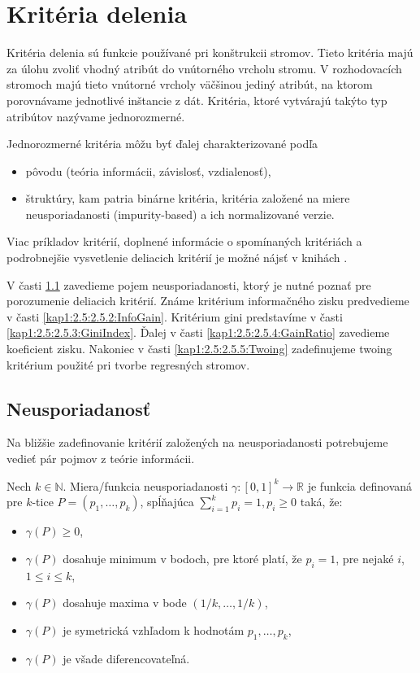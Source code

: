 \section{Kritéria delenia}\label{kap1:2.5:DTSplitCriterias}
Kritéria delenia sú funkcie používané pri konštrukcii stromov. Tieto kritéria majú za úlohu zvoliť vhodný atribút do vnútorného vrcholu stromu.
V rozhodovacích stromoch majú tieto vnútorné vrcholy väčšinou jediný atribút, na ktorom porovnávame jednotlivé inštancie z dát. Kritéria, ktoré vytvárajú takýto typ atribútov nazývame jednorozmerné.

Jednorozmerné kritéria môžu byť ďalej charakterizované podľa
\begin{itemize}
\item pôvodu (teória informácii, závislosť, vzdialenosť),
\item štruktúry, kam patria binárne kritéria, kritéria založené na miere neusporiadanosti (impurity-based) a ich normalizované verzie.
\end{itemize}

Viac príkladov kritérií, doplnené informácie o spomínaných kritériách a podrobnejšie vysvetlenie deliacich kritérií je možné nájsť v knihách \cite{kap1-DataMiningForTrees,kap1-StatisticLearn}. 

V časti \ref{kap1:2.5:2.5.1:Impurity} zavedieme pojem neusporiadanosti, ktorý je nutné poznať pre porozumenie deliacich kritérií. Známe kritérium informačného zisku predvedieme v časti \ref{kap1:2.5:2.5.2:InfoGain}. Kritérium gini predstavíme v časti \ref{kap1:2.5:2.5.3:GiniIndex}. Ďalej v časti \ref{kap1:2.5:2.5.4:GainRatio} zavedieme koeficient zisku. Nakoniec v časti \ref{kap1:2.5:2.5.5:Twoing} zadefinujeme twoing kritérium použité pri tvorbe regresných stromov.
\subsection{Neusporiadanosť}\label{kap1:2.5:2.5.1:Impurity}
Na bližšie zadefinovanie kritérií založených na neusporiadanosti potrebujeme vedieť pár pojmov z teórie informácii.  
\begin{def-sk}\label{kap1:2.5:2.5.1:ImpurityFunction}
Nech $k \in \mathbb{N}$. Miera/funkcia neusporiadanosti $\gamma: [0,1]^{k}  \rightarrow \mathbb{R}$ je funkcia definovaná pre $k$-tice $P = (p_{1},\ldots,p_{k})$, spĺňajúca $\sum_{i=1}^{k}p_{i} = 1, p_{i} \geq 0$ taká, že:
\begin{itemize}
\item $\gamma(P) \geq 0$,
\item $\gamma(P)$ dosahuje minimum v bodoch, pre ktoré platí, že $p_{i} = 1$, pre nejaké $i$, $1 \leq i \leq k$,
\item $\gamma(P)$ dosahuje maxima v bode $(1/k,\ldots,1/k)$,
\item $\gamma(P)$ je symetrická vzhľadom k hodnotám $p_{1},\ldots,p_{k}$,
\item $\gamma(P)$ je všade diferencovateľná.
\end{itemize}
\end{def-sk}

